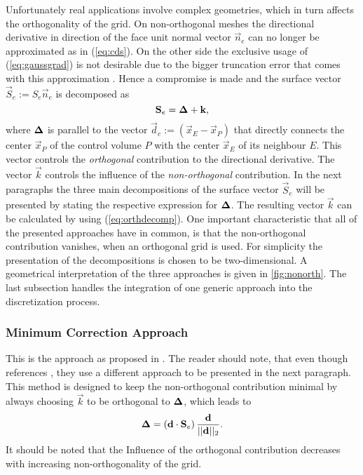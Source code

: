 Unfortunately real applications involve complex geometries, which in turn affects the orthogonality of the grid. On non-orthogonal meshes the directional derivative in direction of the face unit normal vector \(\vec{n}_e\) can no longer be approximated as in (\ref{eq:cds}). On the other side the exclusive usage of (\ref{eq:gaussgrad}) is not desirable due to the bigger truncation error that comes with this approximation \cite{jasak96}. Hence a compromise is made and the surface vector \(\vec{S}_e := S_e \vec{n}_e\) is decomposed as
\begin{equation}
  \label{eq:orthdecomp}
  \mathbf{S}_e = \boldsymbol{\Delta} + \mathbf{k},
\end{equation}
where \(\boldsymbol{\Delta}\) is parallel to the vector \(\vec{d}_e := \left(\vec{x}_E - \vec{x}_P\right)\) that directly connects the center \(\vec{x}_P\) of the control volume \(P\) with the center \(\vec{x}_E\) of its neighbour \(E\). This vector controls the \emph{orthogonal} contribution to the directional derivative. The vector \(\vec{k}\) controls the influence of the \emph{non-orthogonal} contribution. In the next paragraphs the three main decompositions of the surface vector \(\vec{S}_e\) will be presented by stating the respective expression for \(\boldsymbol{\Delta}\). The resulting vector \(\vec{k}\) can be calculated by using (\ref{eq:orthdecomp}). One important characteristic that all of the presented approaches have in common, is that the non-orthogonal contribution vanishes, when an orthogonal grid is used. For simplicity the presentation of the decompositions is chosen to be two-dimensional. A geometrical interpretation of the three approaches is given in \ref{fig:nonorth}. The last subsection handles the integration of one generic approach into the discretization process.

\subsubsection{Minimum Correction Approach}

This is the approach as proposed in \cite{muzaferja}. The reader should note, that even though \cite{ferziger02} references \cite{muzaferja}, they use a different approach to be presented in the next paragraph. This method is designed to keep the non-orthogonal contribution minimal by always choosing \(\vec{k}\) to be orthogonal to \(\boldsymbol{\Delta}\), which leads to
\begin{displaymath}
  \boldsymbol{\Delta} = \left( \mathbf{d} \cdot \mathbf{S}_e \right) \frac{\mathbf{d}}{||\mathbf{d}||_2}.
\end{displaymath}
It should be noted that the Influence of the orthogonal contribution decreases with increasing non-orthogonality of the grid.

